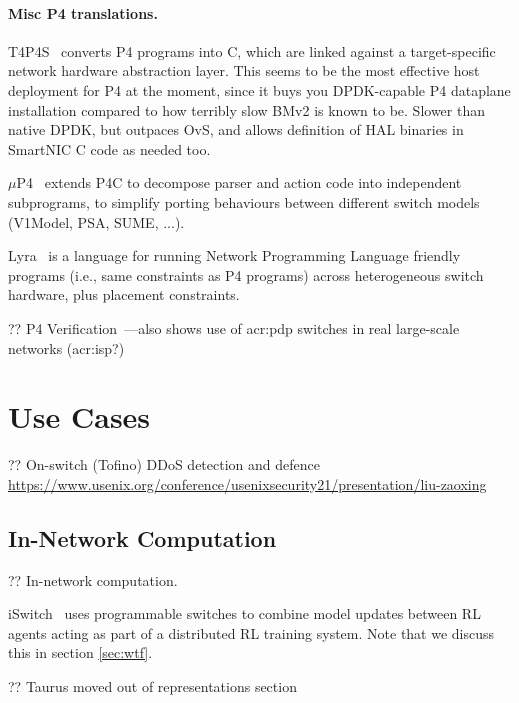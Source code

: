 \paragraph{Misc P4 translations.}
T4P4S~\parencite{DBLP:conf/hpsr/VorosHKLTL18} converts P4 programs into C, which are linked against a target-specific network hardware abstraction layer.
This seems to be the most effective host deployment for P4 at the moment, since it buys you DPDK-capable P4 dataplane installation compared to how terribly slow BMv2 is known to be.
Slower than native DPDK, but outpaces OvS, and allows definition of HAL binaries in SmartNIC C code as needed too.

$\mu$P4~\parencite{DBLP:conf/sigcomm/SoniR0DF20} extends P4C to decompose parser and action code into independent subprograms, to simplify porting behaviours between different switch models (V1Model, PSA, SUME, ...).

Lyra~\parencite{DBLP:conf/sigcomm/GaoZLMZTSCZY20} is a language for running Network Programming Language friendly programs (i.e., same constraints as P4 programs) across heterogeneous switch hardware, plus placement constraints.

?? P4 Verification~\parencite{DBLP:conf/sigcomm/TianGLZCZDYMTLW21}---also shows use of \gls{acr:pdp} switches in real large-scale networks (\gls{acr:isp}?)

\section{Use Cases}

?? On-switch (Tofino) DDoS detection and defence \url{https://www.usenix.org/conference/usenixsecurity21/presentation/liu-zaoxing}

\subsection{In-Network Computation}\label{sec:in-network-computation}
?? In-network computation.

iSwitch~\cite{DBLP:conf/isca/LiLYCSH19} uses programmable switches to combine model updates between RL agents acting as part of a distributed RL training system.
Note that we discuss this in section \ref{sec:wtf}.

?? Taurus moved out of representations section~\parencite{DBLP:journals/corr/abs-2002-08987}

